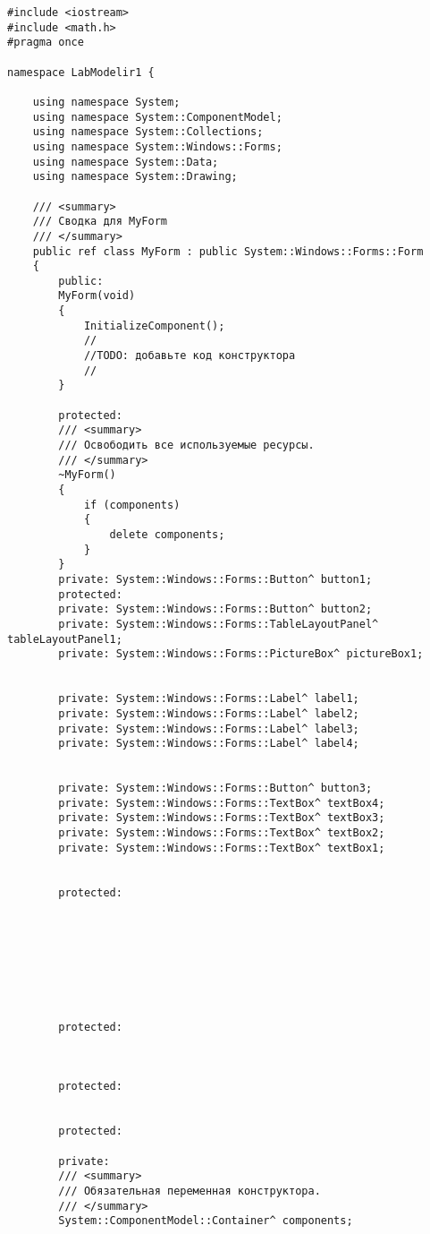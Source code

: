 \documentclass[a4paper,12pt]{article}
\begin{document}
\begin{verbatim}
#include <iostream>
#include <math.h>
#pragma once

namespace LabModelir1 {
	
	using namespace System;
	using namespace System::ComponentModel;
	using namespace System::Collections;
	using namespace System::Windows::Forms;
	using namespace System::Data;
	using namespace System::Drawing;
	
	/// <summary>
	/// Сводка для MyForm
	/// </summary>
	public ref class MyForm : public System::Windows::Forms::Form
	{
		public:
		MyForm(void)
		{
			InitializeComponent();
			//
			//TODO: добавьте код конструктора
			//
		}
		
		protected:
		/// <summary>
		/// Освободить все используемые ресурсы.
		/// </summary>
		~MyForm()
		{
			if (components)
			{
				delete components;
			}
		}
		private: System::Windows::Forms::Button^ button1;
		protected:
		private: System::Windows::Forms::Button^ button2;
		private: System::Windows::Forms::TableLayoutPanel^ tableLayoutPanel1;
		private: System::Windows::Forms::PictureBox^ pictureBox1;
		
		
		private: System::Windows::Forms::Label^ label1;
		private: System::Windows::Forms::Label^ label2;
		private: System::Windows::Forms::Label^ label3;
		private: System::Windows::Forms::Label^ label4;
		
		
		private: System::Windows::Forms::Button^ button3;
		private: System::Windows::Forms::TextBox^ textBox4;
		private: System::Windows::Forms::TextBox^ textBox3;
		private: System::Windows::Forms::TextBox^ textBox2;
		private: System::Windows::Forms::TextBox^ textBox1;
		
		
		protected:
		
		
		
		
		
		
		
		
		protected:
		
		
		
		protected:
		
		
		protected:
		
		private:
		/// <summary>
		/// Обязательная переменная конструктора.
		/// </summary>
		System::ComponentModel::Container^ components;
		

\end{verbatim}
\end{document}
